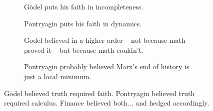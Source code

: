 \begin{figure}[H]
    \centering
  
    \begin{subfigure}[t]{0.45\textwidth}
    \centering
    \caption*{Gödel puts his faith in incompleteness.}
    \end{subfigure}
    \hfill
    \begin{subfigure}[t]{0.45\textwidth}
    \centering
    \caption*{Pontryagin puts his faith in dynamics.}
    \end{subfigure}
  
    \vspace{1em}
  
    \begin{subfigure}[t]{0.45\textwidth}
    \centering
    \caption*{Godel believed in a higher order -- not because math proved it -- but because math couldn’t.}
    \end{subfigure}
    \hfill
    \begin{subfigure}[t]{0.45\textwidth}
    \centering
    \caption*{Pontryagin probably believed Marx's end of history is just a local minimum.}
    \end{subfigure}
  
    \caption{Gödel believed truth required faith. Pontryagin believed truth required calculus. Finance believed both... and hedged accordingly.}
  \end{figure}
  


